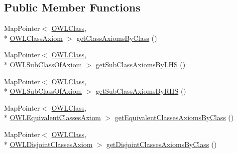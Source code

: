 \subsection*{Public Member Functions}
\begin{DoxyCompactItemize}
\item 
Map\-Pointer$<$ \hyperlink{interfaceorg_1_1semanticweb_1_1owlapi_1_1model_1_1_o_w_l_class}{O\-W\-L\-Class}, \\*
\hyperlink{interfaceorg_1_1semanticweb_1_1owlapi_1_1model_1_1_o_w_l_class_axiom}{O\-W\-L\-Class\-Axiom} $>$ \hyperlink{classuk_1_1ac_1_1manchester_1_1cs_1_1owl_1_1owlapi_1_1_abstract_internals_impl_a9de77f961afd0d3eeccab16ae715b6dc}{get\-Class\-Axioms\-By\-Class} ()
\item 
Map\-Pointer$<$ \hyperlink{interfaceorg_1_1semanticweb_1_1owlapi_1_1model_1_1_o_w_l_class}{O\-W\-L\-Class}, \\*
\hyperlink{interfaceorg_1_1semanticweb_1_1owlapi_1_1model_1_1_o_w_l_sub_class_of_axiom}{O\-W\-L\-Sub\-Class\-Of\-Axiom} $>$ \hyperlink{classuk_1_1ac_1_1manchester_1_1cs_1_1owl_1_1owlapi_1_1_abstract_internals_impl_a1ff2b60c5c0362a3fa4ecbb920e32462}{get\-Sub\-Class\-Axioms\-By\-L\-H\-S} ()
\item 
Map\-Pointer$<$ \hyperlink{interfaceorg_1_1semanticweb_1_1owlapi_1_1model_1_1_o_w_l_class}{O\-W\-L\-Class}, \\*
\hyperlink{interfaceorg_1_1semanticweb_1_1owlapi_1_1model_1_1_o_w_l_sub_class_of_axiom}{O\-W\-L\-Sub\-Class\-Of\-Axiom} $>$ \hyperlink{classuk_1_1ac_1_1manchester_1_1cs_1_1owl_1_1owlapi_1_1_abstract_internals_impl_ac4b2d0abfb0a877cec68570f6cc7bb74}{get\-Sub\-Class\-Axioms\-By\-R\-H\-S} ()
\item 
Map\-Pointer$<$ \hyperlink{interfaceorg_1_1semanticweb_1_1owlapi_1_1model_1_1_o_w_l_class}{O\-W\-L\-Class}, \\*
\hyperlink{interfaceorg_1_1semanticweb_1_1owlapi_1_1model_1_1_o_w_l_equivalent_classes_axiom}{O\-W\-L\-Equivalent\-Classes\-Axiom} $>$ \hyperlink{classuk_1_1ac_1_1manchester_1_1cs_1_1owl_1_1owlapi_1_1_abstract_internals_impl_a404ea15eac552faba072f7163e4b90ac}{get\-Equivalent\-Classes\-Axioms\-By\-Class} ()
\item 
Map\-Pointer$<$ \hyperlink{interfaceorg_1_1semanticweb_1_1owlapi_1_1model_1_1_o_w_l_class}{O\-W\-L\-Class}, \\*
\hyperlink{interfaceorg_1_1semanticweb_1_1owlapi_1_1model_1_1_o_w_l_disjoint_classes_axiom}{O\-W\-L\-Disjoint\-Classes\-Axiom} $>$ \hyperlink{classuk_1_1ac_1_1manchester_1_1cs_1_1owl_1_1owlapi_1_1_abstract_internals_impl_ae4524c62fca17cd2a41f058f376c55ae}{get\-Disjoint\-Classes\-Axioms\-By\-Class} ()

\end{DoxyCompactItemize}
